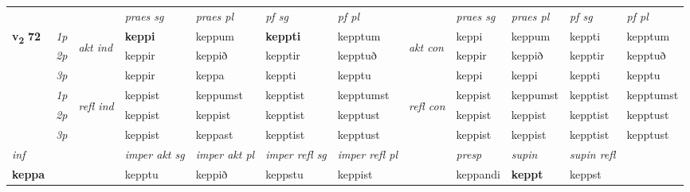 \begin{longtable}[l]{X>{\footnotesize\itshape}llXXXXlXXXX}
\midrule

 & &   & \textit{praes sg}  & \textit{praes pl}    & \textit{ pf sg} & \textit{pf pl} & & \textit{praes sg}  & \textit{praes pl}    & \textit{pf sg} & \textit{pf pl }  \\ \cmidrule{4-7} \cmidrule{9-12}
 \multirow{2}{*}{{{\textbf{v{\textsubscript{2}}} \Large{\textbf{72}}}}}  & 1p & \multirow{3}{*}{\begin{turn}{90}\textit{akt ind}\end{turn}} & \textbf{keppi} & keppum & \textbf{keppti} & kepptum & \multirow{3}{*}{\begin{turn}{90}\textit{akt con}\end{turn}} &keppi & keppum & keppti & kepptum\\*
 & 2p &  &  keppir  & keppið & kepptir & kepptuð & & keppir & keppið & kepptir & kepptuð \\*
 & 3p &  & keppir & keppa & keppti & kepptu & & keppi & keppi& keppti & kepptu \\*
\cmidrule{4-7} \cmidrule{9-12}
 & 1p & \multirow{3}{*}{\begin{turn}{90}\textit{refl ind}\end{turn}}  & keppist & keppumst & kepptist & kepptumst & \multirow{3}{*}{\begin{turn}{90}\textit{refl con}\end{turn}}  &keppist & keppumst & kepptist & kepptumst \\*
 & 2p &  & keppist & keppist & kepptist & kepptust & &keppist & keppist & kepptist & kepptust \\*
 & 3p  & & keppist & keppast & kepptist & kepptust & & keppist & keppist& kepptist & kepptust \\*
\cmidrule{4-7} \cmidrule{9-12}

   {\textit{inf}} & &  & \textit{imper akt sg} & \textit{imper akt pl} & \textit{imper refl sg} & \textit{imper refl pl} && \textit{presp} & \textit{supin} & \textit{supin refl}  \\*
  {\textbf{keppa}} & && kepptu  & keppið & keppstu & keppist && keppandi &  \textbf{keppt} & keppst  \\*

\midrule


\end{longtable}

